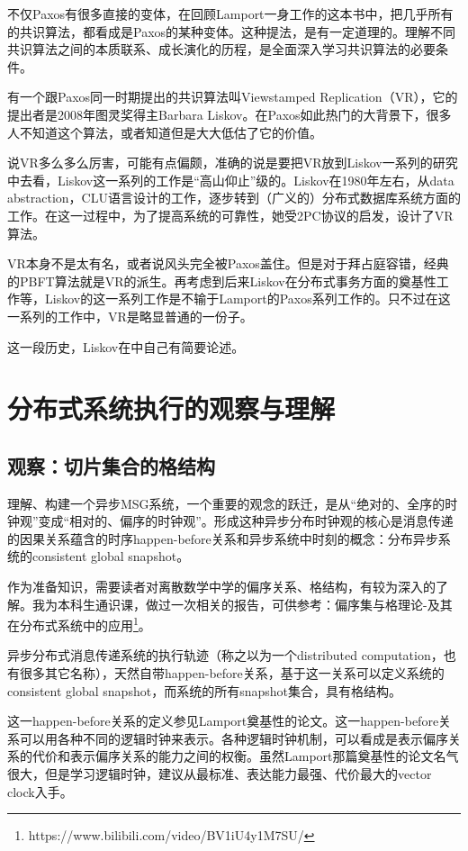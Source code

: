 \documentclass[UTF8]{ctexrep}
\begin{document}
不仅Paxos有很多直接的变体，在回顾Lamport一身工作的这本书中\cite{Malkhi19}，把几乎所有的共识算法，都看成是Paxos的某种变体。这种提法，是有一定道理的。理解不同共识算法之间的本质联系、成长演化的历程，是全面深入学习共识算法的必要条件。

有一个跟Paxos同一时期提出的共识算法叫Viewstamped Replication（VR），它的提出者是2008年图灵奖得主Barbara Liskov。在Paxos如此热门的大背景下，很多人不知道这个算法，或者知道但是大大低估了它的价值。

说VR多么多么厉害，可能有点偏颇，准确的说是要把VR放到Liskov一系列的研究中去看，Liskov这一系列的工作是“高山仰止”级的。Liskov在1980年左右，从data abstraction，CLU语言设计的工作，逐步转到（广义的）分布式数据库系统方面的工作。在这一过程中，为了提高系统的可靠性，她受2PC协议的启发，设计了VR算法。

VR本身不是太有名，或者说风头完全被Paxos盖住。但是对于拜占庭容错，经典的PBFT算法就是VR的派生。再考虑到后来Liskov在分布式事务方面的奠基性工作\cite{Adya99}等，Liskov的这一系列工作是不输于Lamport的Paxos系列工作的。只不过在这一系列的工作中，VR是略显普通的一份子。

这一段历史，Liskov在\cite[Chp. 7]{Charron10}中自己有简要论述。



\chapter{分布式系统执行的观察与理解}

\section{观察：切片集合的格结构}

理解、构建一个异步MSG系统，一个重要的观念的跃迁，是从“绝对的、全序的时钟观”变成“相对的、偏序的时钟观”。形成这种异步分布时钟观的核心是消息传递的因果关系蕴含的时序happen-before关系和异步系统中时刻的概念：分布异步系统的consistent global snapshot。

作为准备知识，需要读者对离散数学中学的偏序关系、格结构，有较为深入的了解。我为本科生通识课，做过一次相关的报告，可供参考：偏序集与格理论-及其在分布式系统中的应用\footnote{https://www.bilibili.com/video/BV1iU4y1M7SU/}。

异步分布式消息传递系统的执行轨迹（称之以为一个distributed computation，也有很多其它名称），天然自带happen-before关系，基于这一关系可以定义系统的consistent global snapshot，而系统的所有snapshot集合，具有格结构。

这一happen-before关系的定义参见Lamport奠基性的论文\cite{Lamport78}。这一happen-before关系可以用各种不同的逻辑时钟来表示。各种逻辑时钟机制，可以看成是表示偏序关系的代价和表示偏序关系的能力之间的权衡。虽然Lamport那篇奠基性的论文名气很大，但是学习逻辑时钟，建议从最标准、表达能力最强、代价最大的vector clock入手\cite{Mattern89}。
\end{document}

